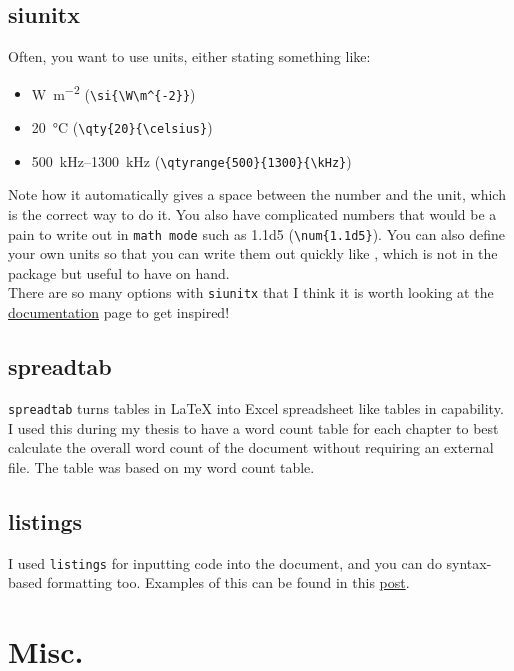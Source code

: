 \subsection{siunitx}
Often, you want to use units, either stating something like:
\begin{itemize}[noitemsep]
    \item \si{\W\m^{-2}} (\verb|\si{\W\m^{-2}}|)
    \item \qty{20}{\celsius} (\verb|\qty{20}{\celsius}|)
    \item \qtyrange{500}{1300}{\kHz} (\verb|\qtyrange{500}{1300}{\kHz}|)
\end{itemize}
Note how it automatically gives a space between the number and the unit, which is the correct way to do it.
You also have complicated numbers that would be a pain to write out in \texttt{math mode} such as \num{1.1d5} (\verb|\num{1.1d5}|).
You can also define your own units so that you can write them out quickly like , which is not in the package but useful to have on hand.\\

There are so many options with \texttt{siunitx} that I think it is worth looking at the \href{https://texdoc.org/serve/siunitx/0}{documentation} page to get inspired! 

\subsection{spreadtab}
\texttt{spreadtab} turns tables in \LaTeX{} into Excel spreadsheet like tables in capability. I used this during my thesis to have a word count table for each chapter to best calculate the overall word count of the document without requiring an external file.
The table was based on my word count table.

\subsection{listings}
I used \texttt{listings} for inputting code into the document, and you can do syntax-based formatting too.
Examples of this can be found in this \href{https://www.overleaf.com/learn/latex/Code_listing}{post}.



\section{Misc.}

